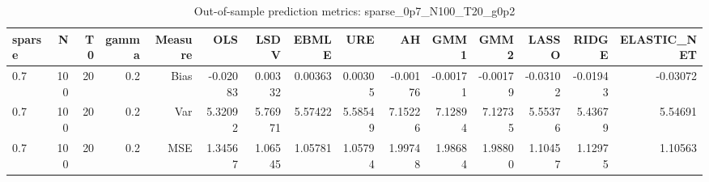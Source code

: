 \begin{table}[!htbp]\centering
\caption{Out-of-sample prediction metrics: sparse_0p7_N100_T20_g0p2}
\label{tab:table3_sparse_0p7_N100_T20_g0p2}
\begin{tabular}{lrrrrrrrrrrrrrr}
\hline
sparse & N & T0 & gamma & Measure & OLS & LSDV & EBMLE & URE & AH & GMM1 & GMM2 & LASSO & RIDGE & ELASTIC_NET \\
\hline
0.7 & 100 & 20 & 0.2 & Bias & -0.02083 & 0.00332 & 0.00363 & 0.00305 & -0.00176 & -0.00171 & -0.00179 & -0.03102 & -0.01943 & -0.03072 \\
0.7 & 100 & 20 & 0.2 & Var & 5.32092 & 5.76971 & 5.57422 & 5.58549 & 7.15226 & 7.12894 & 7.12735 & 5.55376 & 5.43679 & 5.54691 \\
0.7 & 100 & 20 & 0.2 & MSE & 1.34567 & 1.06545 & 1.05781 & 1.05794 & 1.99748 & 1.98684 & 1.98800 & 1.10457 & 1.12975 & 1.10563 \\
\hline
\end{tabular}
\end{table}

